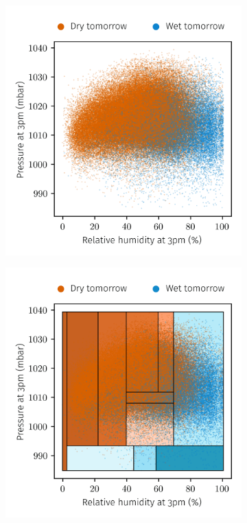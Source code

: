 \begin{figure}[ht]
  \centering
  \begin{subfigure}{0.49\textwidth}
    \centering
    \includegraphics[scale=0.8]{graphics/weather_data.png}%
  \end{subfigure}
  \begin{subfigure}{0.49\textwidth}
    \centering
    \includegraphics[scale=0.8]{graphics/weather_data_filled_partition.png}%

\end{subfigure}
\end{figure}

